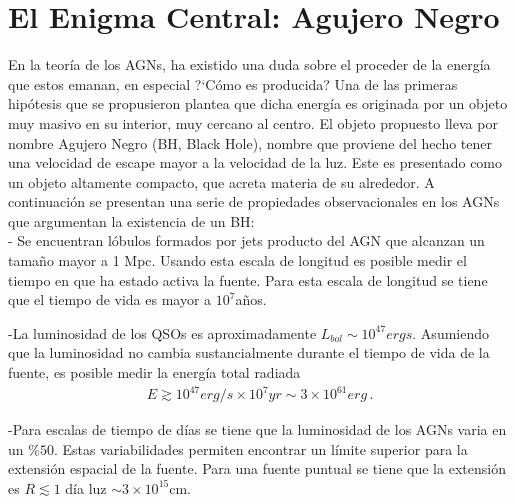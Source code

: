 \section{El Enigma Central: Agujero Negro}
\label{sec: Enigma_centarl}


En la teoría de los AGNs, ha existido una duda sobre el proceder de la energía que estos emanan, en especial ?`Cómo es producida? Una de las primeras hipótesis que se propusieron plantea que dicha energía es originada por un objeto muy masivo en su interior, muy cercano al centro. El objeto propuesto lleva por nombre  Agujero Negro (BH, Black Hole), nombre que proviene del hecho tener una velocidad de escape mayor a la velocidad de la luz. Este es presentado como un objeto altamente compacto, que acreta materia de su alrededor. A continuación se presentan una serie de propiedades observacionales en los AGNs que argumentan la existencia de un BH: \\

- Se encuentran lóbulos formados por jets producto del AGN
que alcanzan un tamaño  mayor a 1 Mpc. Usando esta escala de longitud es posible medir el tiempo en que ha estado activa la fuente. Para esta escala de longitud se tiene que el tiempo de vida es mayor a $10^{7}$años.

-La luminosidad de los QSOs es aproximadamente $L_{bol}\sim 10^{47}ergs$. Asumiendo que la luminosidad no cambia sustancialmente durante el tiempo de vida de la fuente, es posible medir la energía total radiada
\begin{align}
E \gtrsim 10^{47} erg/s \times 10^{7}yr \sim 3\times 10^{61}erg\,.
\end{align}

-Para escalas de tiempo de días se tiene que la luminosidad de los AGNs varia en un $\% 50$. Estas variabilidades permiten encontrar un límite superior para la extensión espacial de la fuente. Para una fuente puntual se tiene que la extensión es $R \lesssim 1$ día luz $\sim3\times10^{15}$cm.\\


